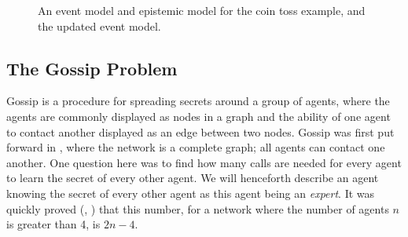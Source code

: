\documentclass[12pt, a4paper]{article}
\begin{document}
\begin{figure}[h]
  \centering
  \label{fig:cointoss}
  \caption{An event model and epistemic model for the coin toss example, and the
  updated event model. }
\end{figure}
    

\subsection{The Gossip Problem}

Gossip is a procedure for spreading secrets around a group of agents, where the
agents are commonly displayed as nodes in a graph and the ability of one agent
to contact another displayed as an edge between two nodes. Gossip was first put
forward in \cite{Tijdeman:1971}, where the network is a complete graph; all
agents can contact one another. One question here was to find how many calls are
needed for every agent to learn the secret of every other agent. We will
henceforth describe an agent knowing the secret of every other agent as this
agent being an \textit{expert}. It was quickly proved (\cite{TelephoneDisease},
\cite{GandT}) that this number, for a network where the number of agents $n$ is
greater than 4, is $2n - 4$.
 
\end{document}
